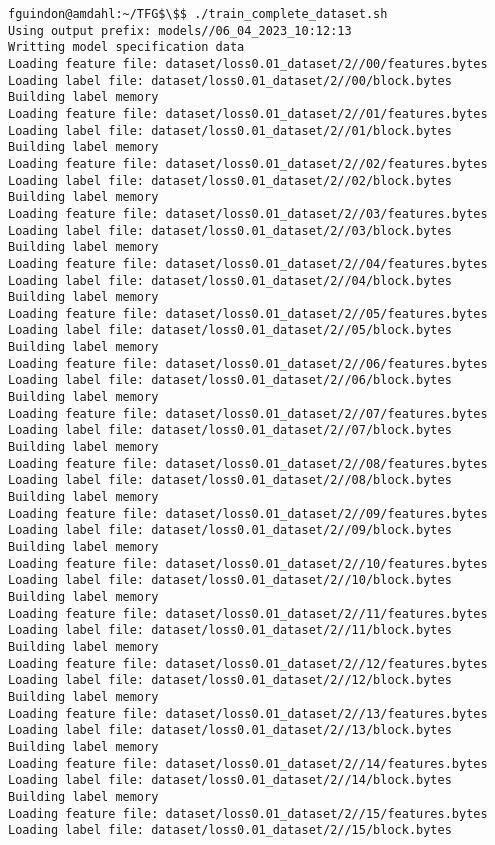 \documentclass[12pt,oneside]{book}
\begin{document}
\begin{lstlisting}
fguindon@amdahl:~/TFG$\$$ ./train_complete_dataset.sh
Using output prefix: models//06_04_2023_10:12:13
Writting model specification data
Loading feature file: dataset/loss0.01_dataset/2//00/features.bytes
Loading label file: dataset/loss0.01_dataset/2//00/block.bytes
Building label memory
Loading feature file: dataset/loss0.01_dataset/2//01/features.bytes
Loading label file: dataset/loss0.01_dataset/2//01/block.bytes
Building label memory
Loading feature file: dataset/loss0.01_dataset/2//02/features.bytes
Loading label file: dataset/loss0.01_dataset/2//02/block.bytes
Building label memory
Loading feature file: dataset/loss0.01_dataset/2//03/features.bytes
Loading label file: dataset/loss0.01_dataset/2//03/block.bytes
Building label memory
Loading feature file: dataset/loss0.01_dataset/2//04/features.bytes
Loading label file: dataset/loss0.01_dataset/2//04/block.bytes
Building label memory
Loading feature file: dataset/loss0.01_dataset/2//05/features.bytes
Loading label file: dataset/loss0.01_dataset/2//05/block.bytes
Building label memory
Loading feature file: dataset/loss0.01_dataset/2//06/features.bytes
Loading label file: dataset/loss0.01_dataset/2//06/block.bytes
Building label memory
Loading feature file: dataset/loss0.01_dataset/2//07/features.bytes
Loading label file: dataset/loss0.01_dataset/2//07/block.bytes
Building label memory
Loading feature file: dataset/loss0.01_dataset/2//08/features.bytes
Loading label file: dataset/loss0.01_dataset/2//08/block.bytes
Building label memory
Loading feature file: dataset/loss0.01_dataset/2//09/features.bytes
Loading label file: dataset/loss0.01_dataset/2//09/block.bytes
Building label memory
Loading feature file: dataset/loss0.01_dataset/2//10/features.bytes
Loading label file: dataset/loss0.01_dataset/2//10/block.bytes
Building label memory
Loading feature file: dataset/loss0.01_dataset/2//11/features.bytes
Loading label file: dataset/loss0.01_dataset/2//11/block.bytes
Building label memory
Loading feature file: dataset/loss0.01_dataset/2//12/features.bytes
Loading label file: dataset/loss0.01_dataset/2//12/block.bytes
Building label memory
Loading feature file: dataset/loss0.01_dataset/2//13/features.bytes
Loading label file: dataset/loss0.01_dataset/2//13/block.bytes
Building label memory
Loading feature file: dataset/loss0.01_dataset/2//14/features.bytes
Loading label file: dataset/loss0.01_dataset/2//14/block.bytes
Building label memory
Loading feature file: dataset/loss0.01_dataset/2//15/features.bytes
Loading label file: dataset/loss0.01_dataset/2//15/block.bytes

\end{lstlisting}
\end{document}
